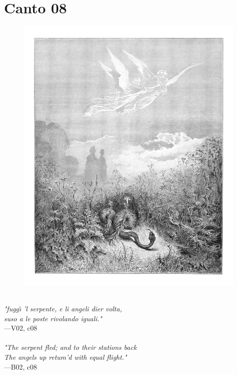 \documentclass[../Dore_vision.tex]{subfiles}
\begin{document}
\newpage

\section{Canto 08}

\begin{figure}[ht]
\centering
\includegraphics[height=\figsize]{illustrations/book_2/V02, c08.jpg}
\end{figure}

\begin{center}
\begin{minipage}{0.8\linewidth}
\textit{\\
"fugg\`{\i} ’l serpente, e li angeli dier volta,\\suso a le poste rivolando iguali."} \\
—V02, c08 \\~\\
\textit{"The serpent fled; and to their stations back\\The angels up retum'd with equal flight."} \\
—B02, c08
\end{minipage}
\end{center}
\end{document}
